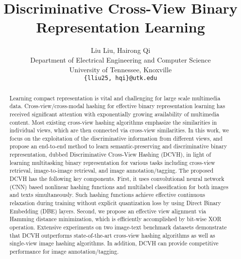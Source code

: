 \documentclass[10pt,twocolumn,letterpaper]{article}
\begin{document}
\title{Discriminative Cross-View Binary Representation Learning}

\author{Liu Liu, Hairong Qi\\
Department of Electrical Engineering and Computer Science\\
University of Tennessee, Knoxville\\
{\tt\small \{lliu25, hqi\}@utk.edu}
}

\maketitle
\ifwacvfinal\thispagestyle{empty}\fi

\begin{abstract}
Learning compact representation is vital and challenging for large scale multimedia data. Cross-view/cross-modal hashing for effective binary representation learning has received significant attention with exponentially growing availability of multimedia content. Most existing cross-view hashing algorithms emphasize the similarities in individual views, which are then connected via cross-view similarities. 
In this work, we focus on the exploitation of the discriminative information from different views, and propose an end-to-end method to learn semantic-preserving and discriminative binary representation, dubbed Discriminative Cross-View Hashing (DCVH), in light of learning multitasking binary representation for various tasks including cross-view retrieval, image-to-image retrieval, and image annotation/tagging. 
The proposed DCVH has the following key components. First, it uses convolutional neural network (CNN) based nonlinear hashing functions and multilabel classification for both images and texts simultaneously. Such hashing functions achieve effective continuous relaxation during training without explicit quantization loss by using Direct Binary Embedding (DBE) layers. Second, we propose an effective view alignment via Hamming distance minimization, which is efficiently accomplished by bit-wise XOR operation. Extensive experiments on two image-text benchmark datasets demonstrate that DCVH outperforms state-of-the-art cross-view hashing algorithms as well as single-view image hashing algorithms. In addition, DCVH can provide competitive performance for image annotation/tagging. 
\end{abstract}
\end{document}
